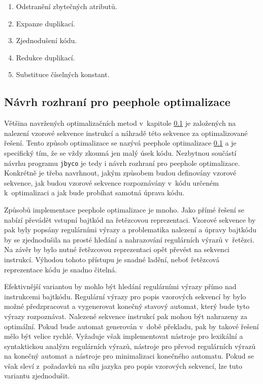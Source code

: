 \begin{enumerate}
\setlength{\itemsep}{0pt}
\setlength{\parskip}{0pt}
\item Odstranění zbytečných atributů.
\item Expanze duplikací. 
\item Zjednodušení kódu.
\item Redukce duplikací.
\item Substituce číselných konstant.
\end{enumerate}


\subsection{Návrh rozhraní pro peephole optimalizace}

Většina navržených optimalizačních metod v~kapitole \ref{} je založených na nalezení vzorové sekvence instrukcí a náhradě této sekvence za optimalizované řešení. Tento způsob optimalizace se nazývá peephole optimalizace \ref{} a je specifický tím, že se vždy zkoumá jen malý úsek kódu. Nezbytnou součástí návrhu programu \texttt{jbyco} je tedy i návrh rozhraní pro peephole optimalizace. Konkrétně je třeba navrhnout, jakým způsobem budou definovány vzorové sekvence, jak budou vzorové sekvence rozpoznávány v~kódu určeném k~optimalizaci a jak bude probíhat samotná úprava kódu.

Způsobů implementace peephole optimalizace je mnoho. Jako přímé řešení se nabízí převádět vstupní bajtkód na řetězcovou reprezentaci. Vzorové sekvence by pak byly popsány regulárními výrazy a problematika nalezení a úpravy bajtkódu by se zjednodušila na prosté hledání a nahrazování regulárních výrazů v~řetězci. Na závěr by bylo nutné řetězcovou reprezentaci opět převést na sekvenci instrukcí. Výhodou tohoto přístupu je snadné ladění, neboť řetězcová reprezentace kódu je snadno čitelná.

Efektivnější variantou by mohlo být hledání regulárními výrazy přímo nad instrukcemi bajtkódu. Regulární výrazy pro popis vzorových sekvencí by bylo možné předzpracovat a vygenerovat konečný stavový automat, který bude tyto výrazy rozpoznávat. Nalezené sekvence instrukcí pak mohou být nahrazeny za optimální. Pokud bude automat generován v~době překladu, pak by takové řešení mělo být velice rychlé. Vyžaduje však implementovat nástroje pro lexikální a syntaktickou analýzu regulárních výrazů, nástroje pro převod regulárních výrazů na konečný automat a nástroje pro minimalizaci konečného automatu. Pokud se však sleví z~požadavků na sílu jazyka pro popis vzorových sekvencí, lze tuto variantu zjednodušit.

